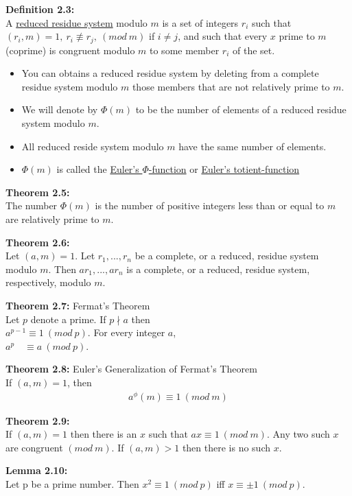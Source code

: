 \documentclass[a4paper]{article}
\begin{document}
\textbf{Definition 2.3:}\\
A \underline{reduced residue system} modulo $m$ is a set of integers $r_i$ such
that\\ $(r_i,m)=1,\ r_i\not\equiv r_j,\ (mod\ m)$ if $i\neq j$, and such that every
$x$ prime to $m$ (coprime) is congruent modulo $m$ to some member $r_i$ of the set.
\begin{itemize}
    \item You can obtains a reduced residue system by deleting from a complete
    residue system modulo
    $m$ those members that are not relatively prime to $m$.
    \item We will denote by $\Phi(m)$ to be the number of elements of a reduced
    residue system modulo $m$.
    \item All reduced reside system modulo $m$ have the same number of elements.
    \item $\Phi(m)$ is called the \underline{Euler's $\Phi$-function} or
    \underline{Euler's totient-function}
\end{itemize}

\textbf{Theorem 2.5:}\\
The number $\Phi(m)$ is the number of positive integers less than or equal to
$m$ are relatively prime to $m$.

\textbf{Theorem 2.6:}\\
Let $(a,m)=1$. Let $r_1,...,r_n$ be a complete, or a reduced,
residue system modulo $m$. Then $ar_1,...,ar_n$ is a complete,
or a reduced, residue system, respectively, modulo $m$.


\textbf{Theorem 2.7:} Fermat's Theorem\\
Let $p$ denote a prime. If $p\nmid a$ then\\
$a^{p-1}\equiv 1\ (mod\ p)$. For every integer $a$,\\
$a^{p}\quad\equiv a\ (mod\ p)$.

\textbf{Theorem 2.8:} Euler's Generalization of Fermat's Theorem\\
If $(a,m)=1$, then
\begin{align}
    a^\phi(m)\equiv 1\ (mod\ m)
\end{align}

\textbf{Theorem 2.9:}\\
If $(a,m)=1$ then there is an $x$ such that $ax\equiv 1\ (mod\ m)$.
Any two such $x$ are congruent $(mod\ m)$.
If $(a,m)>1$ then there is no such $x$.

\textbf{Lemma 2.10:}\\
Let p be a prime number.
Then $x^2\equiv 1\ (mod\ p)$ iff $x\equiv\pm 1\ (mod\ p)$.
\end{document}
